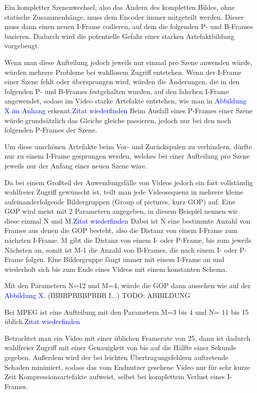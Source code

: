 Ein kompletter Szenenwechsel, also das Ändern des kompletten Bildes, ohne statische Zusammenhänge, muss dem Encoder immer mitgeteilt werden. Dieser muss dann einen neuen I-Frame codieren, auf dem die folgenden P- und B-Frames basieren. Dadurch wird die potentielle Gefahr einer starken Artefaktbildung vorgebeugt.

Wenn man diese Aufteilung jedoch jeweils nur einmal pro Szene anwenden würde, würden mehrere Probleme bei wahllosem Zugriff entstehen. Wenn der I-Frame einer Szene fehlt oder übersprungen wird, würden die Änderungen, die in den folgenden P- und B-Frames festgehalten wurden, auf den falschen I-Frame angewendet, sodass im Video starke Artefakte entstehen, wie man in \textcolor{blue}{Abbildung X im Anhang} erkennt.\textcolor{blue}{Zitat wiederfinden} Beim Ausfall eines P-Frames einer Szene würde grundsätzlich das Gleiche gleiche passieren, jedoch nur bei den noch folgenden P-Frames der Szene.

Um diese unschönen Artefakte beim Vor- und Zurückspulen zu verhindern, dürfte nur zu einem I-Frame gesprungen werden, welches bei einer Aufteilung pro Szene jeweils nur der Anfang einer neuen Szene wäre.

Da bei einem Großteil der Anwendungsfälle von Videos jedoch ein fast vollständig wahlfreier Zugriff gewünscht ist, teilt man jede Videosequenz in mehrere kleine aufeinanderfolgende Bildergruppen (Group of pictures, kurz GOP) auf. Eine GOP wird meist mit 2 Parametern angegeben, in diesem Beispiel nennen wir diese einmal N und M.\textcolor{blue}{Zitat wiederfinden}
Dabei ist N eine bestimmte Anzahl von Frames aus denen die GOP besteht, also die Distanz von einem I-Frame zum nächsten I-Frame.
M gibt die Distanz von einem I- oder P-Frame, bis zum jeweils Nächsten an, somit ist M-1 die Anzahl von B-Frames, die nach einem I- oder P-Frame folgen. Eine Bildergruppe fängt immer mit einem I-Frame an und wiederholt sich bis zum Ende eines Videos mit einem konstanten Schema.

Mit den Parametern N=12 und M=4, würde die GOP dann aussehen wie auf der \textcolor{blue}{Abbildung X}. (IBBBPBBBPBBB I...) TODO: ABBILDUNG 

Bei MPEG ist eine Aufteilung mit den Parametern M=3 bis 4 und N= 11 bis 15 üblich.\textcolor{blue}{Zitat wiederfinden}

Betrachtet man ein Video mit einer üblichen Framerate von 25, dann ist dadurch wahlfreier Zugriff mit einer Genauigkeit von bis auf die Hälfte einer Sekunde gegeben. Außerdem wird der bei leichten Übertragungsfehlern auftretende Schaden minimiert, sodass das vom Endnutzer gesehene Video nur für sehr kurze Zeit Kompressionsartefakte aufweist, selbst bei komplettem Verlust eines I-Frames. 

